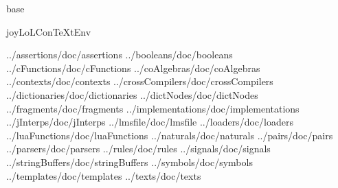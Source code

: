 
\usemodule[t-diSimp]

\startDiSimpComponent base

\diSimpEnvironment joyLoLConTeXtEnv

\diSimpComponent ../assertions/doc/assertions
\diSimpComponent ../booleans/doc/booleans
\diSimpComponent ../cFunctions/doc/cFunctions
\diSimpComponent ../coAlgebras/doc/coAlgebras
\diSimpComponent ../contexts/doc/contexts
\diSimpComponent ../crossCompilers/doc/crossCompilers
\diSimpComponent ../dictionaries/doc/dictionaries
\diSimpComponent ../dictNodes/doc/dictNodes
\diSimpComponent ../fragments/doc/fragments
\diSimpComponent ../implementations/doc/implementations
\diSimpComponent ../jInterps/doc/jInterps
\diSimpComponent ../lmsfile/doc/lmsfile
\diSimpComponent ../loaders/doc/loaders
\diSimpComponent ../luaFunctions/doc/luaFunctions
\diSimpComponent ../naturals/doc/naturals
\diSimpComponent ../pairs/doc/pairs
\diSimpComponent ../parsers/doc/parsers
\diSimpComponent ../rules/doc/rules
\diSimpComponent ../signals/doc/signals
\diSimpComponent ../stringBuffers/doc/stringBuffers
\diSimpComponent ../symbols/doc/symbols
\diSimpComponent ../templates/doc/templates
\diSimpComponent ../texts/doc/texts


\stopDiSimpComponent
